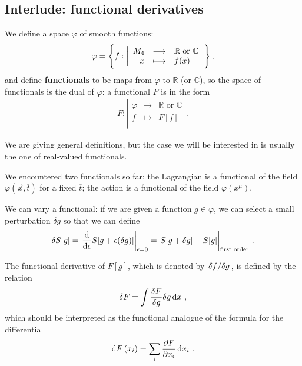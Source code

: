 \documentclass[main.tex]{subfiles}
\begin{document}
\subsection{Interlude: functional derivatives}

We define a space \(\varphi \) of smooth functions: 
%
\begin{align}
\varphi = \qty{
 f:
\left|
  \begin{array}{rcl}
    M_{4} & \longrightarrow & \mathbb{R} \text{ or } \mathbb{C} \\
    x & \longmapsto & f(x) \\
  \end{array}
\right.
}
\,,
\end{align}
%
and define \textbf{functionals} to be maps from \(\varphi \) to \(\mathbb{R}\) (or \(\mathbb{C}\)), so the space of functionals is the dual of \(\varphi \): a functional \(F\) is in the form
%
\begin{align}
 F:
\left|
  \begin{array}{rcl}
    \varphi  & \longrightarrow & \mathbb{R} \text{ or } \mathbb{C}   \\
    f & \longmapsto & F[f] \\
  \end{array}
\right.
\,.
\end{align}

We are giving general definitions, but the case we will be interested in is usually the one of real-valued functionals.

We encountered two functionals so far: the Lagrangian is a functional of the field \(\varphi (\vec{x}, \overline{t})\) for a fixed \(\overline{t}\); the action is a functional of the field \(\varphi (x^{\mu })\).

We can vary a functional: if we are given a function \(g \in \varphi \), we can select a small perturbation \(\delta g\) so that we can define 
%
\begin{align}
\delta S[g] =  \eval{\dv{}{\epsilon } S[g + \epsilon (\delta g )]}_{\epsilon =0}
= \eval{S[g + \delta g] - S[g]}_{\text{first order}}
\,.
\end{align}

The functional derivative of \(F[g]\), which is denoted by \(\fdv*{f}{g}\), is defined by the relation 
%
\begin{align}
\delta F = \int \fdv{F}{g} \delta g \dd{x}
\,,
\end{align}
%
which should be interpreted as the functional analogue of the formula for the differential 
%
\begin{align}
\dd{F} (x_{i}) = \sum _{i} \pdv{F}{x_{i}} \dd{x_{i}} 
\,.
\end{align}
\end{document}
